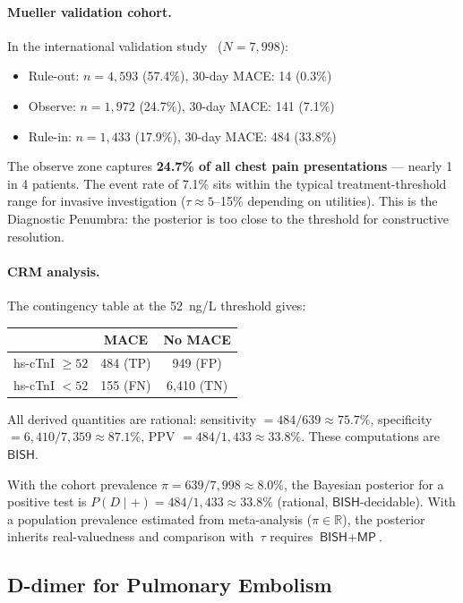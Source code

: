 \documentclass[11pt,a4paper]{article}
\theoremstyle{plain}
\theoremstyle{definition}
\newcommand{\BISH}{\textsf{BISH}}
\newcommand{\MP}{\textsf{MP}}
\newcommand{\R}{\mathbb{R}}
\begin{document}
\paragraph{Mueller validation cohort.}  In the international validation study~\cite{mueller2019} ($N = 7{,}998$):
\begin{itemize}[nosep]
\item Rule-out: $n = 4{,}593$ (57.4\%), 30-day MACE: 14 (0.3\%)
\item Observe: $n = 1{,}972$ (24.7\%), 30-day MACE: 141 (7.1\%)
\item Rule-in: $n = 1{,}433$ (17.9\%), 30-day MACE: 484 (33.8\%)
\end{itemize}

The observe zone captures \textbf{24.7\% of all chest pain presentations} --- nearly 1 in 4 patients.  The event rate of 7.1\% sits within the typical treatment-threshold range for invasive investigation ($\tau \approx 5$--15\% depending on utilities).  This is the Diagnostic Penumbra: the posterior is too close to the threshold for constructive resolution.

\paragraph{CRM analysis.}  The contingency table at the 52~ng/L threshold gives:
\begin{center}
\begin{tabular}{lcc}
\toprule
& MACE & No MACE \\
\midrule
hs-cTnI $\geq 52$ & 484 (TP) & 949 (FP) \\
hs-cTnI $< 52$ & 155 (FN) & 6{,}410 (TN) \\
\bottomrule
\end{tabular}
\end{center}

All derived quantities are rational: sensitivity $= 484/639 \approx 75.7\%$, specificity $= 6{,}410/7{,}359 \approx 87.1\%$, PPV $= 484/1{,}433 \approx 33.8\%$.  These computations are $\BISH$.

With the cohort prevalence $\pi = 639/7{,}998 \approx 8.0\%$, the Bayesian posterior for a positive test is $P(D\mid+) = 484/1{,}433 \approx 33.8\%$ (rational, $\BISH$-decidable).  With a population prevalence estimated from meta-analysis ($\pi \in \R$), the posterior inherits real-valuedness and comparison with~$\tau$ requires $\BISH + \MP$.

\subsection{D-dimer for Pulmonary Embolism}
\end{document}
